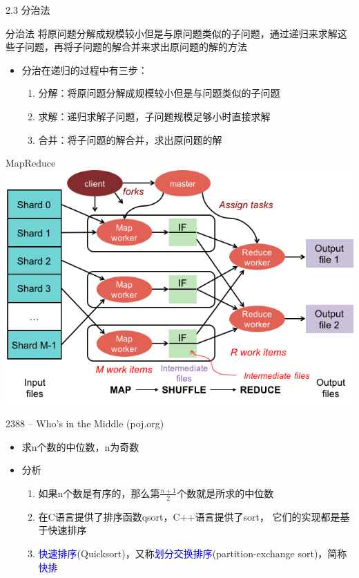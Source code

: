 \documentclass{beamer}
\begin{document}
\begin{frame}{2.3 分治法}
    \begin{block}{分治法}
        将原问题分解成规模较小但是与原问题类似的子问题，通过递归来求解这些子问题，再将子问题的解合并来求出原问题的解的方法
    \end{block}
    \vfill
    \begin{itemize}
        \item 分治在递归的过程中有三步：
        \begin{enumerate}
            \item 分解：将原问题分解成规模较小但是与问题类似的子问题
            \item 求解：递归求解子问题，子问题规模足够小时直接求解
            \item 合并：将子问题的解合并，求出原问题的解
        \end{enumerate}
    \end{itemize}
\end{frame}
\begin{frame}{MapReduce}
    \includegraphics[scale=0.45]{fig/2-3.png}
\end{frame}
\begin{frame}{2388 -- Who's in the Middle (poj.org)}
    \begin{itemize}
        \item 求n个数的中位数，n为奇数
    \end{itemize}
    \vfill
    \begin{itemize}
        \item 分析
        \begin{enumerate}
            \item 如果n个数是有序的，那么第$\frac{n+1}{2}$个数就是所求的中位数
            \item 在C语言提供了排序函数qsort，C++语言提供了sort， 它们的实现都是基于快速排序
            \item \textcolor{blue}{快速排序}(Quicksort)，又称\textcolor{blue}{划分交换排序}(partition-exchange sort)，简称\textcolor{blue}{快排}
        \end{enumerate}
    \end{itemize}
\end{frame}
\end{document}
